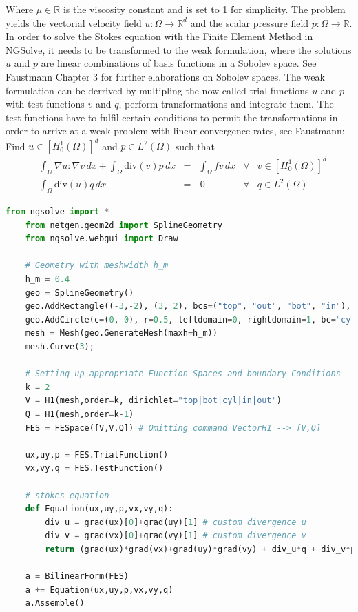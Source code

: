 \null

Where $\mu \in \mathbb{R}$ is the viscosity constant and is set to 1 for simplicity. 
The problem yields the vectorial velocity field $u:\Omega \rightarrow \mathbb{R}^d$ and 
the scalar pressure field $p:\Omega \rightarrow \mathbb{R}$. In order to solve the Stokes equation with the Finite Element Method in NGSolve,
it needs to be transformed to the weak formulation, where the solutions $u$ and $p$ are linear combinations of basis functions in a Sobolev space.
See Faustmann\cite{lecture_notes_faustmann_numPDE} Chapter 3 for further elaborations on Sobolev spaces. The weak formulation can be derrived by
multipling the now called trial-functions $u$ and $p$ with test-functions $v$ and $q$, perform transformations and integrate them. The test-functions have to fulfil certain
conditions to permit the transformations in order to arrive at a weak problem with 
linear convergence rates, see Faustmann\cite{lecture_notes_faustmann_numPDE}: \\

Find $u \in [H^1_0(\Omega)]^d$ and $p \in L^2(\Omega)$ such that
\begin{equation}\label{weak_stokes_PDE}
    \begin{aligned}
    &\int_{\Omega} \nabla u : \nabla v \, dx + \int_{\Omega} \mathrm{div}(v)p \, dx &=& \int_{\Omega}f v \, dx &\forall& v \in [H^1_0(\Omega)]^d \\
    &\int_{\Omega} \mathrm{div}(u)q \, dx &=& \, 0   &\forall& q \in L^2(\Omega)
    \end{aligned}
\end{equation}

\pagebreak

\begin{lstlisting}[language=Python, title=Python Listing Title]
    from ngsolve import *
    from netgen.geom2d import SplineGeometry
    from ngsolve.webgui import Draw

    # Geometry with meshwidth h_m
    h_m = 0.4
    geo = SplineGeometry()
    geo.AddRectangle((-3,-2), (3, 2), bcs=("top", "out", "bot", "in"), leftdomain=1, rightdomain=0)
    geo.AddCircle(c=(0, 0), r=0.5, leftdomain=0, rightdomain=1, bc="cyl", maxh=h_m) 
    mesh = Mesh(geo.GenerateMesh(maxh=h_m))
    mesh.Curve(3);

    # Setting up appropriate Function Spaces and boundary Conditions
    k = 2
    V = H1(mesh,order=k, dirichlet="top|bot|cyl|in|out")
    Q = H1(mesh,order=k-1)
    FES = FESpace([V,V,Q]) # Omitting command VectorH1 --> [V,Q] 

    ux,uy,p = FES.TrialFunction()
    vx,vy,q = FES.TestFunction()

    # stokes equation
    def Equation(ux,uy,p,vx,vy,q):
        div_u = grad(ux)[0]+grad(uy)[1] # custom divergence u
        div_v = grad(vx)[0]+grad(vy)[1] # custom divergence v
        return (grad(ux)*grad(vx)+grad(uy)*grad(vy) + div_u*q + div_v*p)* dx

    a = BilinearForm(FES)
    a += Equation(ux,uy,p,vx,vy,q)
    a.Assemble()

\end{lstlisting}

